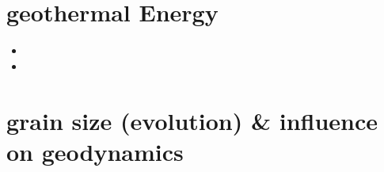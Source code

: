 \section{geothermal Energy} 

\begin{small}
\begin{itemize}
\item[\twothousandfifteen]
\item[\twothousandnineteen]
\end{itemize}
\end{small}

\section{grain size (evolution) \& influence on geodynamics}
\label{sec:topics:gsev}

